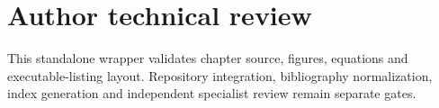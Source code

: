 \documentclass[11pt]{book}
\begin{document}


\chapter*{Author technical review}
This standalone wrapper validates chapter source, figures, equations and executable-listing layout. Repository integration, bibliography normalization, index generation and independent specialist review remain separate gates.
\end{document}
